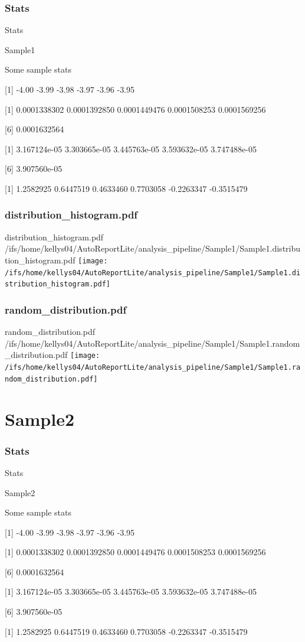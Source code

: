 \documentclass[8pt]{beamer}\usepackage[]{graphicx}\usepackage[]{color}
\begin{document}
\subsubsection{Stats}
\begin{frame}{Stats }
\small{
Sample1 

Some sample stats

[1] -4.00 -3.99 -3.98 -3.97 -3.96 -3.95

[1] 0.0001338302 0.0001392850 0.0001449476 0.0001508253 0.0001569256

[6] 0.0001632564

[1] 3.167124e-05 3.303665e-05 3.445763e-05 3.593632e-05 3.747488e-05

[6] 3.907560e-05

[1]  1.2582925  0.6447519  0.4633460  0.7703058 -0.2263347 -0.3515479
}

\end{frame}

\subsubsection{distribution\_histogram.pdf}
\begin{frame}{distribution\_histogram.pdf }
\scriptsize{/ifs/home/kellys04/AutoReportLite/analysis\_pipeline/Sample1/Sample1.distribution\_histogram.pdf}
\texttt{[image: /ifs/home/kellys04/AutoReportLite/analysis\_pipeline/Sample1/Sample1.distribution\_histogram.pdf]}
\end{frame}

\subsubsection{random\_distribution.pdf}
\begin{frame}{random\_distribution.pdf }
\scriptsize{/ifs/home/kellys04/AutoReportLite/analysis\_pipeline/Sample1/Sample1.random\_distribution.pdf}
\texttt{[image: /ifs/home/kellys04/AutoReportLite/analysis\_pipeline/Sample1/Sample1.random\_distribution.pdf]}
\end{frame}

\section{Sample2}
\subsubsection{Stats}
\begin{frame}{Stats }
\small{
Sample2 

Some sample stats

[1] -4.00 -3.99 -3.98 -3.97 -3.96 -3.95

[1] 0.0001338302 0.0001392850 0.0001449476 0.0001508253 0.0001569256

[6] 0.0001632564

[1] 3.167124e-05 3.303665e-05 3.445763e-05 3.593632e-05 3.747488e-05

[6] 3.907560e-05

[1]  1.2582925  0.6447519  0.4633460  0.7703058 -0.2263347 -0.3515479
}

\end{frame}
\end{document}
